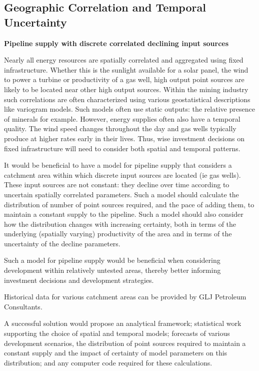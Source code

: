 \documentclass[12pt,a4paper]{article}
\begin{document}
\subsection{Geographic Correlation and Temporal Uncertainty}

{\bf Pipeline supply with discrete correlated declining input sources }

Nearly all energy resources are spatially correlated and aggregated using fixed infrastructure. Whether this is the sunlight available for a solar panel, the wind to power a turbine or productivity of a gas well, high output point sources are likely to be located near other high output sources. Within the mining industry such correlations are often characterized using various geostatistical descriptions like variogram models. Such models often use static outputs: the relative presence of minerals for example. However, energy supplies often also have a temporal quality. The wind speed changes throughout the day and gas wells typically produce at higher rates early in their lives. Thus, wise investment decisions on fixed infrastructure will need to consider both spatial and temporal patterns.

It would be beneficial to have a model for pipeline supply that considers a catchment area within which discrete input sources are located (ie gas wells). These input sources are not constant: they decline over time according to uncertain spatially correlated parameters. Such a model should calculate the distribution of number of point sources required, and the pace of adding them, to maintain a constant supply to the pipeline. Such a model should also consider how the distribution changes with increasing certainty, both in terms of the underlying (spatially varying) productivity of the area and in terms of the uncertainty of the decline parameters.

Such a model for pipeline supply would be beneficial when considering development within relatively untested areas, thereby better informing investment decisions and development strategies.

Historical data for various catchment areas can be provided by GLJ Petroleum Consultants.

A successful solution would propose an analytical framework; statistical work supporting the choice of spatial and temporal models; forecasts of various development scenarios, the distribution of point sources required to maintain a constant supply and the impact of certainty of model parameters on this distribution; and any computer code required for these calculations.
\end{document}
